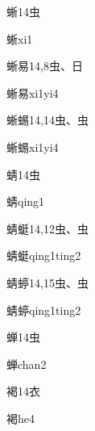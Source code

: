 \begin{entry}{蜥}{14}{⾍}
  \begin{phonetics}{蜥}{xi1}
  \end{phonetics}
\end{entry}

\begin{entry}{蜥易}{14,8}{⾍、⽇}
  \begin{phonetics}{蜥易}{xi1yi4}
  \end{phonetics}
\end{entry}

\begin{entry}{蜥蜴}{14,14}{⾍、⾍}
  \begin{phonetics}{蜥蜴}{xi1yi4}
  \end{phonetics}
\end{entry}

\begin{entry}{蜻}{14}{⾍}
  \begin{phonetics}{蜻}{qing1}
  \end{phonetics}
\end{entry}

\begin{entry}{蜻蜓}{14,12}{⾍、⾍}
  \begin{phonetics}{蜻蜓}{qing1ting2}
  \end{phonetics}
\end{entry}

\begin{entry}{蜻蝏}{14,15}{⾍、⾍}
  \begin{phonetics}{蜻蝏}{qing1ting2}
  \end{phonetics}
\end{entry}

\begin{entry}{蝉}{14}{⾍}
  \begin{phonetics}{蝉}{chan2}
  \end{phonetics}
\end{entry}

\begin{entry}{褐}{14}{⾐}
  \begin{phonetics}{褐}{he4}
  \end{phonetics}
\end{entry}

